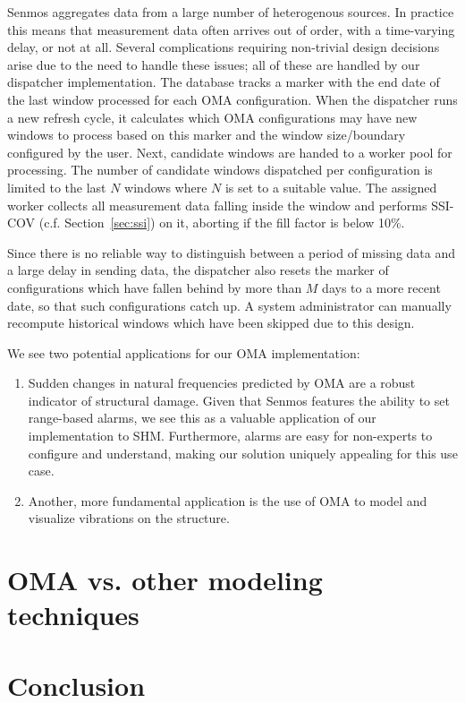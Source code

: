 \documentclass[journal,a4paper]{IEEEtran}
\begin{document}
Senmos aggregates data from a large number of heterogenous sources. In practice this means that measurement data often arrives out of order, with a time-varying delay, or not at all. Several complications requiring non-trivial design decisions arise due to the need to handle these issues; all of these are handled by our dispatcher implementation. The database tracks a marker with the end date of the last window processed for each OMA configuration. When the dispatcher runs a new refresh cycle, it calculates which OMA configurations may have new windows to process based on this marker and the window size/boundary configured by the user. Next, candidate windows are handed to a worker pool for processing. The number of candidate windows dispatched per configuration is limited to the last $N$ windows where $N$ is set to a suitable value. The assigned worker collects all measurement data falling inside the window and performs SSI-COV (c.f. Section~\ref{sec:ssi}) on it, aborting if the fill factor is below 10\%.

Since there is no reliable way to distinguish between a period of missing data and a large delay in sending data, the dispatcher also resets the marker of configurations which have fallen behind by more than $M$ days to a more recent date, so that such configurations catch up. A system administrator can manually recompute historical windows which have been skipped due to this design.

We see two potential applications for our OMA implementation:
\begin{enumerate}
    \item Sudden changes in natural frequencies predicted by OMA are a robust indicator of structural damage. %
    Given that Senmos features the ability to set range-based alarms, we see this as a valuable application of our implementation to SHM.
    Furthermore, alarms are easy for non-experts to configure and understand, making our solution uniquely appealing for this use case.

    \item Another, more fundamental application is the use of OMA to model and visualize vibrations on the structure. %

\end{enumerate}

\section{OMA vs. other modeling techniques}\label{sec:further}


\section{Conclusion}\label{sec:conclusion}

\printbibliography
\end{document}
